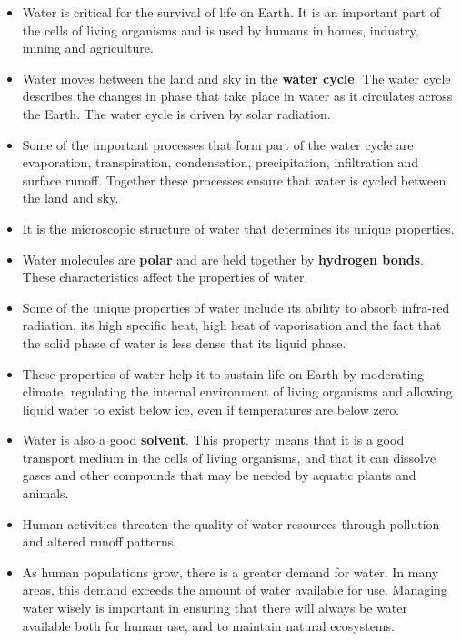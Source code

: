 \begin{itemize}
\item{Water is critical for the survival of life on Earth. It is an important part of the cells of living organisms and is used by humans in homes, industry, mining and agriculture.}
\item{Water moves between the land and sky in the \textbf{water cycle}. The water cycle describes the changes in phase that take place in water as it circulates across the Earth. The water cycle is driven by solar radiation.}
\item{Some of the important processes that form part of the water cycle are evaporation, transpiration, condensation, precipitation, infiltration and surface runoff. Together these processes ensure that water is cycled between the land and sky.}
\item{It is the microscopic structure of water that determines its unique properties.}
\item{Water molecules are \textbf{polar} and are held together by \textbf{hydrogen bonds}. These characteristics affect the properties of water.}
\item{Some of the unique properties of water include its ability to absorb infra-red radiation, its high specific heat, high heat of vaporisation and the fact that the solid phase of water is less dense that its liquid phase.}
\item{These properties of water help it to sustain life on Earth by moderating climate, regulating the internal environment of living organisms and allowing liquid water to exist below ice, even if temperatures are below zero.}
\item{Water is also a good \textbf{solvent}. This property means that it is a good transport medium in the cells of living organisms, and that it can dissolve gases and other compounds that may be needed by aquatic plants and animals.}
\item{Human activities threaten the quality of water resources through pollution and altered runoff patterns.}
\item{As human populations grow, there is a greater demand for water. In many areas, this demand exceeds the amount of water available for use. Managing water wisely is important in ensuring that there will always be water available both for human use, and to maintain natural ecosystems.} 
\end{itemize}


